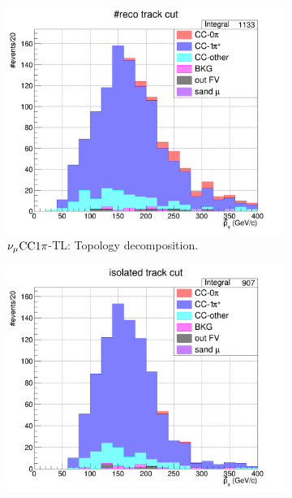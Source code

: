           \begin{figure}[ht]
               \centering
               \begin{subfigure}{\dbfigwid\textwidth}
                    \includegraphics[width=\textwidth]{figures/sel/finhist_pi_mom_topology_TL.png}
                    \caption{$\nu_{\mu}\textrm{CC}1\pi$-TL: Topology decomposition.}
                    \label{subfig:stack-topo-tl}
               \end{subfigure}
               \begin{subfigure}{\dbfigwid\textwidth}
                    \includegraphics[width=\textwidth]{figures/sel/finhist_pi_mom_topology_TR.png}

\end{subfigure}
\end{figure}
